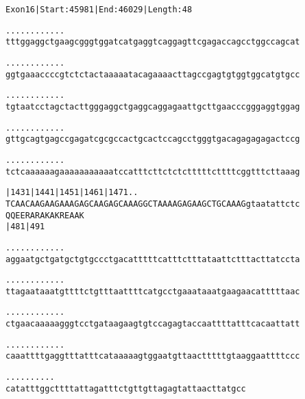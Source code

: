 \documentclass{article}
\begin{document}
\newpage
\begin{alltt}
Exon 16 | Start: 45981 | End: 46029 | Length: 48

.    .    .    .    .    .    .    .    .    .    .    .
tttggaggctgaagcgggtggatcatgaggtcaggagttcgagaccagcctggccagcat



.    .    .    .    .    .    .    .    .    .    .    .
ggtgaaaccccgtctctactaaaaatacagaaaacttagccgagtgtggtggcatgtgcc



.    .    .    .    .    .    .    .    .    .    .    .
tgtaatcctagctacttgggaggctgaggcaggagaattgcttgaacccgggaggtggag



.    .    .    .    .    .    .    .    .    .    .    .
gttgcagtgagccgagatcgcgccactgcactccagcctgggtgacagagagagactccg



.    .    .    .    .    .    .    .    .    .    .    .
tctcaaaaaagaaaaaaaaaaatccatttcttctctctttttcttttcggtttcttaaag



|1431     |1441     |1451     |1461     |1471        .    .
TCAACAAGAAGAAAGAGCAAGAGCAAAGGCTAAAAGAGAAGCTGCAAAGgtaatattctc
 Q  Q  E  E  R  A  R  A  K  A  K  R  E  A  A  K
          |481                          |491

   .    .    .    .    .    .    .    .    .    .    .    .
aggaatgctgatgctgtgccctgacatttttcatttctttataattctttacttatccta



   .    .    .    .    .    .    .    .    .    .    .    .
ttagaataaatgttttctgtttaattttcatgcctgaaataaatgaagaacatttttaac



\end{alltt}
\newpage
\begin{alltt}
   .    .    .    .    .    .    .    .    .    .    .    .
ctgaacaaaaagggtcctgataagaagtgtccagagtaccaattttatttcacaattatt



   .    .    .    .    .    .    .    .    .    .    .    .
caaattttgaggtttatttcataaaaagtggaatgttaactttttgtaaggaattttccc



   .    .    .    .    .    .    .    .    .    .
catatttggcttttattagatttctgttgttagagtattaacttatgcc


\end{alltt}
\newpage
\end{document}
